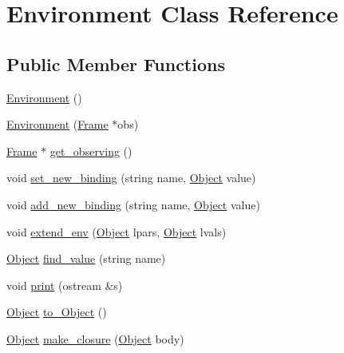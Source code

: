 \hypertarget{classEnvironment}{\section{Environment Class Reference}
\label{classEnvironment}
}
\subsection*{Public Member Functions}
\begin{DoxyCompactItemize}
\item 
\hyperlink{classEnvironment_a8b427c4448d8b7536666837521b9e83d}{Environment} ()
\item 
\hyperlink{classEnvironment_acdb77ec0b3bc9b6b48ce430a8ff8d16d}{Environment} (\hyperlink{classFrame}{Frame} $\ast$obs)
\item 
\hyperlink{classFrame}{Frame} $\ast$ \hyperlink{classEnvironment_a73a2cb3642111c86485f48e70e5e4870}{get\-\_\-observing} ()
\item 
void \hyperlink{classEnvironment_adac8db22e668d2a78a2cc18d0528c396}{set\-\_\-new\-\_\-binding} (string name, \hyperlink{classCell}{Object} value)
\item 
void \hyperlink{classEnvironment_aaa7f24d4804dd8e2e9e95506b7c5bf58}{add\-\_\-new\-\_\-binding} (string name, \hyperlink{classCell}{Object} value)
\item 
void \hyperlink{classEnvironment_a29feed86a6e592d20f8c8882fcd35d6c}{extend\-\_\-env} (\hyperlink{classCell}{Object} lpars, \hyperlink{classCell}{Object} lvals)
\item 
\hyperlink{classCell}{Object} \hyperlink{classEnvironment_aaa0fcf257cf27f961e51a9602cc2cb48}{find\-\_\-value} (string name)
\item 
void \hyperlink{classEnvironment_a61952d5ef784bff91ce1a66d6a00dc99}{print} (ostream \&s)
\item 
\hyperlink{classCell}{Object} \hyperlink{classEnvironment_ace71e43a313cdeefb1e445ecef61825b}{to\-\_\-\-Object} ()
\item 
\hyperlink{classCell}{Object} \hyperlink{classEnvironment_a852ae1aa43ba278c27a91e8dcc968086}{make\-\_\-closure} (\hyperlink{classCell}{Object} body)
\end{DoxyCompactItemize}


